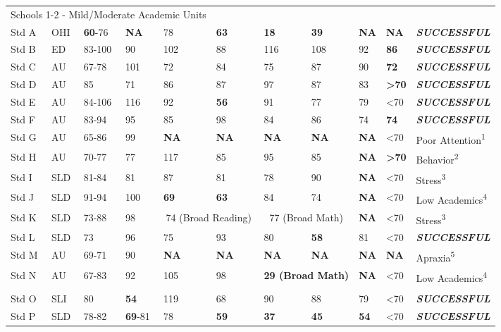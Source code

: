 \documentclass[twoside]{article}
\begin{document}
\begin{tiny}
\begin{landscape}
\begin{longtable}{p{1.5cm}p{1.5cm}p{1.5cm}p{1.5cm}p{1.75cm}p{1.75cm}p{1.75cm}p{1.75cm}p{1.75cm}p{1.75cm}p{2.5cm}@{}}
\multicolumn {5}{l}{Schools 1-2 - Mild/Moderate Academic Units}& & & & & &\\
\cmidrule(lr){1-2}
Std A & OHI & \textbf{60}-76 & \textbf{NA} & 78 & \textbf{63} & \textbf{18} & \textbf{39} & \textbf{NA} & \textbf{NA} & \textbf{\textit{SUCCESSFUL}}\\
Std B & ED & 83-100 & 90 & 102 & 88 & 116 & 108 & 92 & \textbf{86} & \textbf{\textit{SUCCESSFUL}}\\
Std C & AU & 67-78 & 101 & 72 & 84 & 75 & 87 & 90 & \textbf{72} & \textbf{\textit{SUCCESSFUL}}\\
Std D & AU & 85 & 71 & 86 & 87 & 97 & 87 & 83 & \textbf{\textgreater70} & \textbf{\textit{SUCCESSFUL}}\\
Std E & AU & 84-106 & 116 & 92 & \textbf{56} & 91 & 77 & 79 & \textless70 & \textbf{\textit{SUCCESSFUL}}\\
Std F & AU & 83-94 & 95 & 85 & 98 & 84 & 86 & 74 & \textbf{74} & \textbf{\textit{SUCCESSFUL}}\\
Std G & AU & 65-86 & 99 & \textbf{NA} & \textbf{NA} & \textbf{NA} & \textbf{NA} & \textbf{NA} & \textless70 & Poor Attention\textsuperscript{1}\\
Std H & AU & 70-77 & 77 & 117 & 85 & 95 & 85 & \textbf{NA} & \textbf{\textgreater70} & Behavior\textsuperscript{2}\\
Std I & SLD & 81-84 & 81 & 87 & 81 & 78 & 90 & \textbf{NA} & \textless70 & Stress\textsuperscript{3}\\
Std J & SLD & 91-94 & 100 & \textbf{69} & \textbf{63} & 84 & 74 & \textbf{NA} & \textless70 & Low Academics\textsuperscript{4}\\
Std K & SLD & 73-88 & 98 & \multicolumn{2}{c}{74 (Broad Reading)} & \multicolumn {2}{c}{77 (Broad Math)} & \textbf{NA} & \textless70 & Stress\textsuperscript{3}\\
Std L & SLD & 73 & 96 & 75 & 93 & 80 & \textbf{58} & 81 & \textless70 & \textbf{\textit{SUCCESSFUL}}\\
Std M & AU & 69-71 & 90 & \textbf{NA} & \textbf{NA} & \textbf{NA} & \textbf{NA} & \textbf{NA} & \textbf{NA} & Apraxia\textsuperscript{5}\\
Std N & AU & 67-83 & 92 & 105 & 98 & \multicolumn{2}{c}{\textbf{29 (Broad Math)}} & \textbf{NA} & \textless70 & Low Academics\textsuperscript{4}\\
\hline\\
Std O & SLI & 80 & \textbf{54} & 119 & 68 & 90 & 88 & 79 & \textless70 & \textbf{\textit{SUCCESSFUL}}\\
Std P & SLD & 78-82 & \textbf{69}-81 & 78 & \textbf{59} & \textbf{37} & \textbf{45} & \textbf{54} & \textless70 & \textbf{\textit{SUCCESSFUL}}\\

\end{longtable}
\end{landscape}
\end{tiny}
\end{document}
